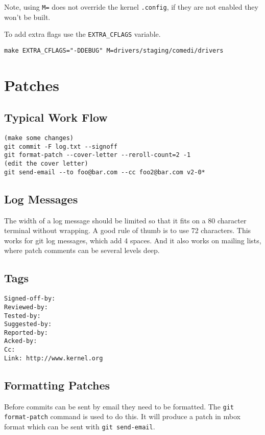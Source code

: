 \documentclass{article}
\begin{document}
Note, using \verb+M=+ does not override the kernel \verb+.config+, if they are not
enabled they won't be built.

To add extra flags use the \verb+EXTRA_CFLAGS+ variable.

\begin{verbatim}
make EXTRA_CFLAGS="-DDEBUG" M=drivers/staging/comedi/drivers
\end{verbatim}

\section{Patches}

\subsection{Typical Work Flow}

\begin{verbatim}
(make some changes)
git commit -F log.txt --signoff
git format-patch --cover-letter --reroll-count=2 -1
(edit the cover letter)
git send-email --to foo@bar.com --cc foo2@bar.com v2-0*
\end{verbatim}

\subsection{Log Messages}

The width of a log message should be limited so that it fits on a 80
character terminal without wrapping.  A good rule of thumb is to use 72
characters.  This works for git log messages, which add 4 spaces.  And
it also works on mailing lists, where patch comments can be several
levels deep.

\subsection{Tags}

\begin{verbatim}
Signed-off-by:
Reviewed-by:
Tested-by:
Suggested-by:
Reported-by:
Acked-by:
Cc:
Link: http://www.kernel.org
\end{verbatim}

\subsection{Formatting Patches}

Before commits can be sent by email they need to be formatted.  The
\verb+git format-patch+ command is used to do this.  It will produce a patch in
mbox format which can be sent with \verb+git send-email+.
\end{document}
